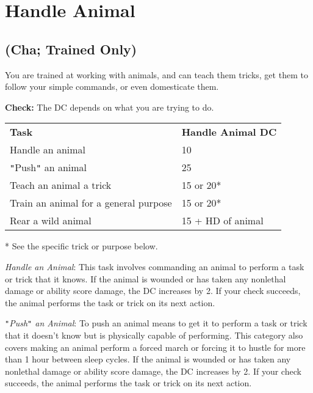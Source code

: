 \section{Handle Animal}

\label{f0}				
\subsection{(Cha; Trained Only)}

				
You are trained at working with animals, and can teach them tricks, get them to follow your simple commands, or even domesticate them.
				
\textbf{Check:} The DC depends on what you are trying to do.
\begin{table}
 \begin{tabular}{ll}
\textbf{Task} & \textbf{Handle Animal DC}\\
Handle an animal & 10\\
\texttt{{}"{}}Push\texttt{{}"{}} an animal & 25\\
Teach an animal a trick & 15 or 20*\\
Train an animal for a general purpose & 15 or 20*\\
Rear a wild animal & 15 + HD of animal \\
\end{tabular}
* See the specific trick or purpose below.
\end{table}
				
\textit{Handle an Animal}: This task involves commanding an animal to perform a task or trick that it knows. If the animal is wounded or has taken any nonlethal damage or ability score damage, the DC increases by 2. If your check succeeds, the animal performs the task or trick on its next action.
				
\texttt{{}"{}}\textit{Push\texttt{{}"{}} an Animal}: To push an animal means to get it to perform a task or trick that it doesn't know but is physically capable of performing. This category also covers making an animal perform a forced march or forcing it to hustle for more than 1 hour between sleep cycles. If the animal is wounded or has taken any nonlethal damage or ability score damage, the DC increases by 2. If your check succeeds, the animal performs the task or trick on its next action.
				
